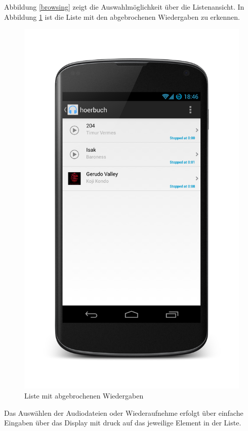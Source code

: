 Abbildung \ref{browsing} zeigt die Auswahlmöglichkeit über die Listenansicht. In Abbildung \ref{broken} ist die Liste mit den abgebrochenen Wiedergaben zu erkennen.

\begin{figure}[h!t]
\begin{center}
\includegraphics[scale=.2]{images/broken}
\caption{Liste mit abgebrochenen Wiedergaben}
\label{broken}
\end{center}
\end{figure}

Das Auswählen der Audiodateien oder Wiederaufnehme erfolgt über einfache Eingaben über das Display mit druck auf das jeweilige Element in der Liste.

